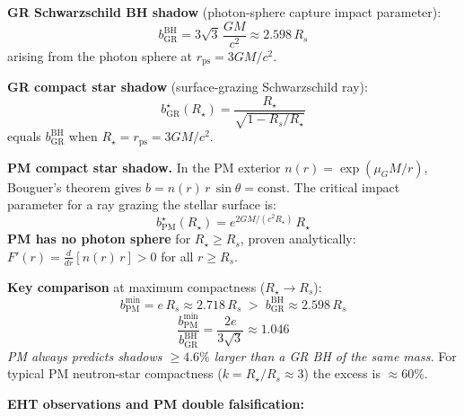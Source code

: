 \documentclass[10pt,twocolumn]{article}
\begin{document}
\textbf{GR Schwarzschild BH shadow} (photon-sphere capture impact parameter):
\[
  b_{\mathrm{GR}}^{\mathrm{BH}} = 3\sqrt{3}\,\frac{GM}{c^2}
  \approx 2.598\,R_s
\]
arising from the photon sphere at $r_{\mathrm{ps}}=3GM/c^2$.

\textbf{GR compact star shadow} (surface-grazing Schwarzschild ray):
\[
  b_{\mathrm{GR}}^{\star}(R_\star) = \frac{R_\star}{\sqrt{1 - R_s/R_\star}}
\]
equals $b_{\mathrm{GR}}^{\mathrm{BH}}$ when $R_\star = r_{\mathrm{ps}} = 3GM/c^2$.

\textbf{PM compact star shadow.}
In the PM exterior $n(r)=\exp(\mu_G M/r)$, Bouguer's theorem gives
$b=n(r)\,r\,\sin\theta=\mathrm{const}$.  The critical impact parameter for a
ray grazing the stellar surface is:
\[
  \boxed{b_{\mathrm{PM}}^{\star}(R_\star) = e^{2GM/(c^2 R_\star)}\,R_\star}
\]
\textbf{PM has no photon sphere} for $R_\star \ge R_s$, proven analytically:
$F'(r)=\tfrac{d}{dr}[n(r)\,r]>0$ for all $r\ge R_s$.

\textbf{Key comparison} at maximum compactness ($R_\star \to R_s$):
\[
  b_{\mathrm{PM}}^{\min} = e\,R_s \approx 2.718\,R_s
  \;>\; b_{\mathrm{GR}}^{\mathrm{BH}} \approx 2.598\,R_s
\]
\[
  \frac{b_{\mathrm{PM}}^{\min}}{b_{\mathrm{GR}}^{\mathrm{BH}}}
  = \frac{2e}{3\sqrt{3}} \approx 1.046
\]
\emph{PM always predicts shadows \(\ge 4.6\%\) larger than a GR BH of the
same mass.}  For typical PM neutron-star compactness ($k=R_\star/R_s\approx3$)
the excess is $\approx\!60\%$.

\begin{center}
\renewcommand{\arraystretch}{1.2}
\end{center}

\textbf{EHT observations and PM double falsification:}
\begin{center}
\end{center}
\end{document}
